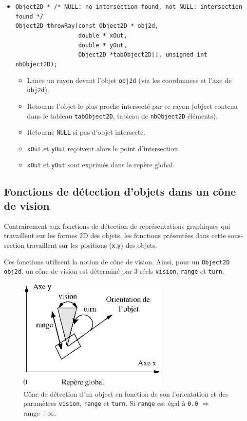 \documentclass[12pt]{article}
\begin{document}
\begin{itemize}
\item \verb!Object2D * /* NULL: no intersection found, not NULL: intersection found */! \\
      \verb!Object2D_throwRay(const Object2D * obj2d,! \\
      \verb!                  double * xOut,!\\
      \verb!                  double * yOut,! \\
      \verb!                  Object2D *tabObject2D[], unsigned int nbObject2D);!
      \begin{itemize}
      \item Lance un rayon devant l'objet \verb!obj2d!
      (via les coordonnees et l'axe de \verb!obj2d!).
      \item Retourne l'objet le plus proche intersect\'e par ce rayon
      (object contenu dans le tableau \verb!tabObject2D!, tableau de
      \verb!nbObject2D! \'el\'ements).
      \item Retourne \verb!NULL! si pas d'objet intersect\'e.
      \item \verb!xOut! et \verb!yOut! re\c coivent alors le point
      d'intersection.
      \item \verb!xOut! et \verb!yOut! sont exprim\'es dans le rep\`ere global.
      \end{itemize}
\end{itemize}

\subsection{Fonctions de d\'etection d'objets dans un c\^one de vision}

Contrairement aux fonctions de d\'etection de repr\'esentations graphiques
qui travaillent sur les formes 2D des objets, les fonctions pr\'esent\'ees
dans cette sous-section travaillent sur les positions ({\tt x},{\tt y}) des
objets.

Ces fonctions utilisent la notion de c\^one de vision.
Ainsi, pour un {\tt Object2D} {\tt obj2d}, un c\^one de vision est
d\'etermin\'e par 3 r\'eels {\tt vision}, {\tt range} et {\tt turn}.

\begin{figure}[hbtp]
\begin{center}
\includegraphics[width=7.5cm]{fig/cone}
\end{center}
\caption{C\^one de d\'etection d'un object en fonction de son l'orientation
et des param\`etres {\tt vision}, {\tt range} et {\tt turn}.
Si {\tt range} est \'egal \`a {\tt 0.0} $\Longrightarrow$ range~: $\infty$.}
\end{figure}
\end{document}
